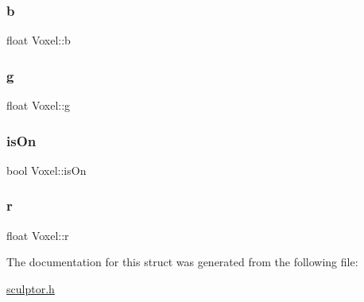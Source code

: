 \mbox{\label{struct_voxel_a5cd8432b1d7d0fd8b79e0fc7d10373a8}} 
\subsubsection{\texorpdfstring{b}{b}}
{\footnotesize\ttfamily float Voxel\+::b}

\mbox{\label{struct_voxel_a27c0da1ed2ff430401d23ff171612a73}} 
\subsubsection{\texorpdfstring{g}{g}}
{\footnotesize\ttfamily float Voxel\+::g}

\mbox{\label{struct_voxel_a6fbe8bd53f64685ac4210726d40fc775}} 
\subsubsection{\texorpdfstring{is\+On}{isOn}}
{\footnotesize\ttfamily bool Voxel\+::is\+On}

\mbox{\label{struct_voxel_a06872ec79b836120b551a848968c0f1b}} 
\subsubsection{\texorpdfstring{r}{r}}
{\footnotesize\ttfamily float Voxel\+::r}



The documentation for this struct was generated from the following file\+:\begin{DoxyCompactItemize}
\item 
\hyperlink{sculptor_8h}{sculptor.\+h}\end{DoxyCompactItemize}
